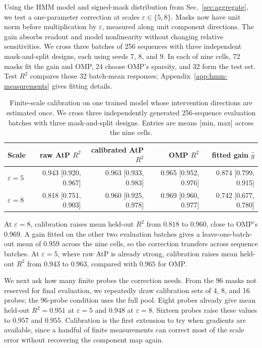 \documentclass[sigconf,10pt,nonacm,balance=false]{acmart}
\newcommand{\eps}{\varepsilon}
\begin{document}
Using the HMM model and signed-mask distribution from Sec.~\ref{sec:aggregate}, we test a one-parameter correction at scales $\eps\in\{5,8\}$. Masks now have unit norm before multiplication by $\eps$, measured along unit component directions. The gain absorbs readout and model nonlinearity without changing relative sensitivities. We cross three batches of 256 sequences with three independent mask-and-split designs, each using seeds 7, 8, and 9. In each of nine cells, 72 masks fit the gain and OMP, 24 choose OMP's sparsity, and 32 form the test set. Test $R^2$ compares those 32 batch-mean responses; Appendix~\ref{app:hmm-measurements} gives fitting details.

\begin{table}[t]
\centering
\caption{Finite-scale calibration on one trained model whose intervention directions are estimated once. We cross three independently generated 256-sequence evaluation batches with three mask-and-split designs. Entries are means [min, max] across the nine cells.}
\label{tab:step0}
\scriptsize
\setlength{\tabcolsep}{1pt}
\begin{tabular}{lrrrr}
\toprule
Scale & raw AtP $R^2$ & calibrated AtP $R^2$ & OMP $R^2$ & fitted gain $\widehat g$ \\
\midrule
$\eps=5$ & 0.943 [0.920, 0.967] & 0.963 [0.933, 0.983] & 0.965 [0.952, 0.976] & 0.874 [0.799, 0.915] \\
$\eps=8$ & 0.818 [0.751, 0.903] & 0.960 [0.925, 0.978] & 0.969 [0.960, 0.977] & 0.742 [0.677, 0.780] \\
\bottomrule
\end{tabular}
\end{table}

At $\eps=8$, calibration raises mean held-out $R^2$ from $0.818$ to $0.960$, close to OMP's $0.969$. A gain fitted on the other two evaluation batches gives a leave-one-batch-out mean of $0.959$ across the nine cells, so the correction transfers across sequence batches. At $\eps=5$, where raw AtP is already strong, calibration raises mean held-out $R^2$ from $0.943$ to $0.963$, compared with $0.965$ for OMP.

We next ask how many finite probes the correction needs. From the 96 masks not reserved for final evaluation, we repeatedly draw calibration sets of 4, 8, and 16 probes; the 96-probe condition uses the full pool. Eight probes already give mean held-out $R^2=0.951$ at $\eps=5$ and $0.948$ at $\eps=8$. Sixteen probes raise these values to $0.957$ and $0.955$. Calibration is the first extension to try when gradients are available, since a handful of finite measurements can correct most of the scale error without recovering the component map again.
\end{document}
